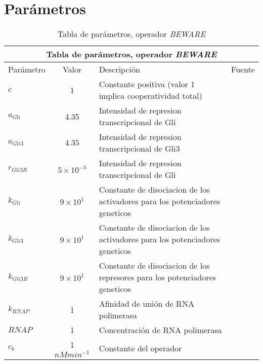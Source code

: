 \section{Parámetros}
\begin{table}[h]
\begin{center}

\begin{tabular}{ |p{3cm}||c|p{3cm}|p{3cm}|  }
	\hline
	\multicolumn{4}{|c|}{Tabla de parámetros, operador \textit{BEWARE}} \\
	\hline
	Parámetro & Valor & Descripción & Fuente\\
	\hline
	$c $  & 1    &\tiny{Constante positiva (valor 1 implica cooperatividad total)} &   \cite{cambon1}\\
	$a_{Gli}$ &   4.35  & \tiny{Intensidad de represion transcripcional de Gli}   & \cite{cambon1}\\
	$a_{Gli3} $ & $4.35$ & \tiny{ Intensidad de represion transcripcional de Gli3 } &  \cite{cambon1}\\
	$r_{Gli3R}$   &$5\times10^{-5}$ & \tiny{ Intensidad de represion transcripcional de Gli } &  \cite{cambon1}\\
	$k_{Gli}$ &  $9\times10^{1}$  & \tiny{ Constante de disociacion de los activadores para los potenciadores geneticos } & \cite{cambon1}\\
	$k_{Gli3}$ & $9\times10^{1}$  & \tiny{ Constante de disociacion de los activadores para los potenciadores geneticos }   & \cite{cambon1}\\
	$k_{Gli3R}$ & $9\times10^{1}$ & \tiny{ Constante de disociacion de los represores para los potenciadores geneticos }   & \cite{cambon1}\\
	
	$k_{RNAP}$& 1  &  \tiny{Afinidad de unión   de RNA polimerasa} & \cite{cambon1}\\
	$RNAP$& 1  & \tiny{Concentración de RNA polimerasa} & \cite{cambon1}\\
	$c_b$& 1 $ nMmin^{-1}$  & \tiny{ Constante del operador} & \cite{cambon1}\\
	\hline
\end{tabular}

\end{center}
\caption{Tabla de parámetros, operador \textit{BEWARE}}\label{beware_params}
\end{table}


